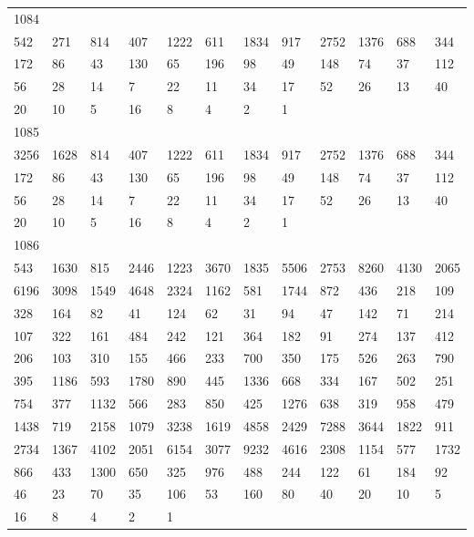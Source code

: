 \begin{longtable}{llllllllllll}
1084&&&&&&&&&&&\\
542& 271& 814& 407& 1222& 611& 1834& 917& 2752& 1376& 688& 344\\
172& 86& 43& 130& 65& 196& 98& 49& 148& 74& 37& 112\\
56& 28& 14& 7& 22& 11& 34& 17& 52& 26& 13& 40\\
20& 10& 5& 16& 8& 4& 2& 1& \\

1085&&&&&&&&&&&\\
3256& 1628& 814& 407& 1222& 611& 1834& 917& 2752& 1376& 688& 344\\
172& 86& 43& 130& 65& 196& 98& 49& 148& 74& 37& 112\\
56& 28& 14& 7& 22& 11& 34& 17& 52& 26& 13& 40\\
20& 10& 5& 16& 8& 4& 2& 1& \\

1086&&&&&&&&&&&\\
543& 1630& 815& 2446& 1223& 3670& 1835& 5506& 2753& 8260& 4130& 2065\\
6196& 3098& 1549& 4648& 2324& 1162& 581& 1744& 872& 436& 218& 109\\
328& 164& 82& 41& 124& 62& 31& 94& 47& 142& 71& 214\\
107& 322& 161& 484& 242& 121& 364& 182& 91& 274& 137& 412\\
206& 103& 310& 155& 466& 233& 700& 350& 175& 526& 263& 790\\
395& 1186& 593& 1780& 890& 445& 1336& 668& 334& 167& 502& 251\\
754& 377& 1132& 566& 283& 850& 425& 1276& 638& 319& 958& 479\\
1438& 719& 2158& 1079& 3238& 1619& 4858& 2429& 7288& 3644& 1822& 911\\
2734& 1367& 4102& 2051& 6154& 3077& 9232& 4616& 2308& 1154& 577& 1732\\
866& 433& 1300& 650& 325& 976& 488& 244& 122& 61& 184& 92\\
46& 23& 70& 35& 106& 53& 160& 80& 40& 20& 10& 5\\
16& 8& 4& 2& 1& \\


\end{longtable}
